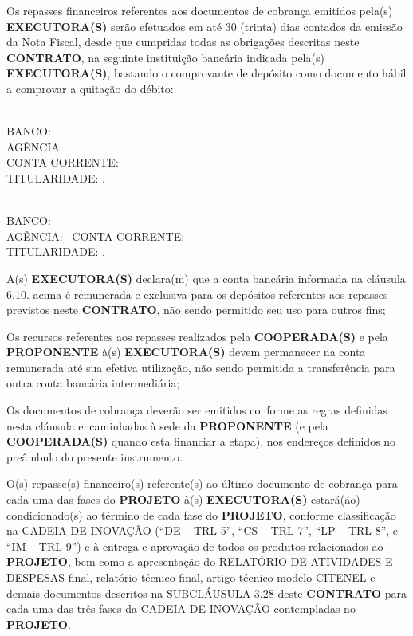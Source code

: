 \xx Os repasses financeiros referentes aos documentos de cobrança emitidos pela(s) \textbf{EXECUTORA(S)} serão efetuados em até 30 (trinta) dias contados da emissão da Nota Fiscal, desde que cumpridas todas as obrigações descritas neste \textbf{CONTRATO}, na seguinte instituição bancária indicada pela(s) \textbf{EXECUTORA(S)}, bastando o comprovante de depósito como documento hábil a comprovar a quitação do débito:

\leftskip 1cm
\textbf{\NomeExecutoraA}\\
BANCO: \BancoExeutoraA\\
AGÊNCIA: \AgenciaExecutoraA\\
CONTA CORRENTE: \ContaCorrenteExecutoraA\\
TITULARIDADE: \TitularidadeExecutoraA.

\textbf{\NomeExecutoraB}\\
BANCO: \BancoExeutoraB\\
AGÊNCIA: \AgenciaExecutoraB\
CONTA CORRENTE: \ContaCorrenteExecutoraB\\
TITULARIDADE: \TitularidadeExecutoraB.

\xxx A(s) \textbf{EXECUTORA(S)} declara(m) que a conta bancária informada na cláusula 6.10. acima é remunerada e exclusiva para os depósitos referentes aos repasses previstos neste \textbf{CONTRATO}, não sendo permitido seu uso para outros fins;

\xxx Os recursos referentes aos repasses realizados pela \textbf{COOPERADA(S)} e pela \textbf{PROPONENTE} à(s) \textbf{EXECUTORA(S)} devem permanecer na conta remunerada até sua efetiva utilização, não sendo permitida a transferência para outra conta bancária intermediária;

\xx Os documentos de cobrança deverão ser emitidos conforme as regras definidas nesta cláusula encaminhadas à sede da \textbf{PROPONENTE} (e pela \textbf{COOPERADA(S)} quando esta financiar a etapa), nos endereços definidos no preâmbulo do presente instrumento.

\xx O(s) repasse(s) financeiro(s) referente(s) ao último documento de cobrança para cada uma das fases do \textbf{PROJETO} à(s) \textbf{EXECUTORA(S)} estará(ão) condicionado(s) ao término de cada fase do \textbf{PROJETO}, conforme classificação na CADEIA DE INOVAÇÃO (“DE – TRL 5”, “CS – TRL 7”, “LP – TRL 8”, e “IM – TRL 9”) e à entrega e aprovação de todos os produtos relacionados ao \textbf{PROJETO}, bem como a apresentação do RELATÓRIO DE ATIVIDADES E DESPESAS final, relatório técnico final, artigo técnico modelo CITENEL e demais documentos descritos na SUBCLÁUSULA 3.28 deste \textbf{CONTRATO} para cada uma das três fases da CADEIA DE INOVAÇÃO contempladas no \textbf{PROJETO}.

